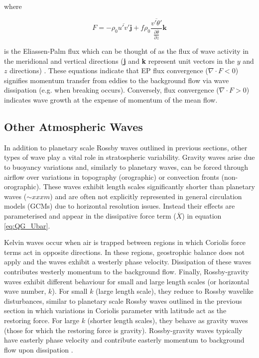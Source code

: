 where

\begin{equation} \label{eq:EP_flux}
F = -\rho_0 \overline{u'v'}\textbf{j} + f\rho_0\frac{\overline{v'\theta'}}{\frac{\partial{\overline{\theta}}}{\partial{z}}} \textbf{k}
\end{equation}

\noindent is the Eliassen-Palm flux which can be thought of as the flux of wave activity in the meridional and vertical directions (\textbf{j} and \textbf{k} represent unit vectors in the $y$ and $z$ directions) \citep{andrewsPlanetary1976}. These equations indicate that EP flux convergence ($\nabla \cdot F < 0$) signifies momentum transfer from eddies to the background flow via wave dissipation (e.g. when breaking occurs). Conversely, flux convergence ($\nabla \cdot F > 0$) indicates wave growth at the expense of momentum of the mean flow. 

\subsection{Other Atmospheric Waves} \label{sec:other_waves}
In addition to planetary scale Rossby waves outlined in previous sections, other types of wave play a vital role in stratospheric variability. Gravity waves arise due to buoyancy variations and, similarly to planetary waves, can be forced through airflow over variations in topography (orographic) or convection fronts (non-orographic). These waves exhibit length scales significantly shorter than planetary waves ($\sim xxxm$) and are often not explicitly represented in general circulation models (GCMs) due to horizontal resolution issues. Instead their effects are parameterised and appear in the dissipative force term ($\overline{X}$) in equation \ref{eq:QG_Ubar}.

Kelvin waves occur when air is trapped between regions in which Coriolis force terms act in opposite directions. In these regions, geostrophic balance does not apply and the waves exhibit a westerly phase velocity. Dissipation of these waves contributes westerly momentum to the background flow. Finally, Rossby-gravity waves exhibit different behaviour for small and large length scales (or horizontal wave number, $k$). For small $k$ (large length scale), they reduce to Rossby wavelike disturbances, similar to planetary scale Rossby waves outlined in the previous section in which variations in Coriolis parameter with latitude act as the restoring force. For large $k$ (shorter length scales), they behave as gravity waves (those for which the restoring force is gravity). Rossby-gravity waves typically have easterly phase velocity and contribute easterly momentum to background flow upon dissipation \citep{andrewsPlanetary1976}.

